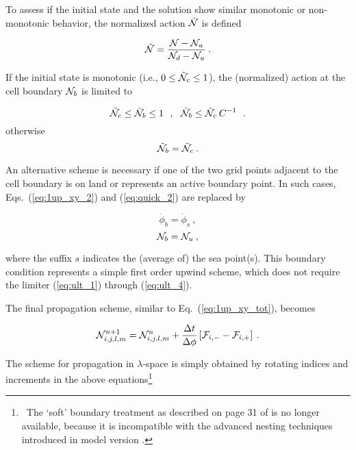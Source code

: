 \noindent
To assess if the initial state and the solution show similar monotonic or
non-monotonic behavior, the normalized action $\tilde{{\cal N}}$ is defined

\begin{equation}
\tilde{{\cal N}} = \frac{{\cal N}-{\cal N}_u}{{\cal N}_d - {\cal N}_u} 
\: . \label{eq:ult_2} \end{equation}

\noindent
If the initial state is monotonic (i.e., $0 \leq \tilde{{\cal N}}_c \leq 1$), the
(normalized) action at the cell boundary ${\cal N}_b$ is limited to

\begin{equation}
\tilde{{\cal N}}_c \leq \tilde{{\cal N}}_b \leq 1 \:\:\: , \:\:\:
\tilde{{\cal N}}_b \leq \tilde{{\cal N}}_c \: C^{-1} \:\:\: . 
\label{eq:ult_3} \end{equation}
\noindent otherwise \begin{equation}
\tilde{{\cal N}}_b = \tilde{{\cal N}}_c 
\: . \label{eq:ult_4} \end{equation}

\noindent
An alternative scheme is necessary if one of the two grid points adjacent to
the cell boundary is on land or represents an active boundary point. In such
cases, Eqs.~(\ref{eq:1up_xy_2}) and (\ref{eq:quick_2}) are replaced by


\begin{equation}
\dot{\phi}_b = \dot{\phi}_s \: ,
\label{eq:1_vel} \end{equation} \begin{equation}
{\cal N}_b = {\cal N}_u \: ,
\label{eq:1_bval} \end{equation}

\noindent
where the suffix $s$ indicates the (average of) the sea point(s). This
boundary condition represents a simple first order upwind scheme, which does
not require the limiter (\ref{eq:ult_1}) through (\ref{eq:ult_4}).

The final propagation scheme, similar to Eq.~(\ref{eq:1up_xy_tot}),  becomes


\begin{equation}
{\cal N}_{i,j,l,m}^{n+1} = {\cal N}_{i,j,l,m}^n +
\frac{\Delta t}{\Delta \phi} \left [ {\cal F}_{i,-} - {\cal F}_{i,+} \right ]
\: . \label{eq:uq_xy_tot} \end{equation}

\noindent
The scheme for propagation in $\lambda$-space is simply obtained by rotating
indices and increments in the above equations\footnote{~The `soft' boundary
treatment as described on page 31 of \cite{tol:OMB02c} is no longer available,
because it is incompatible with the advanced nesting techniques introduced in
model version \WWver.}

